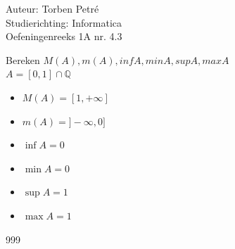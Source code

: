 \documentclass[a4paper]{article}
\newcommand{\Q}{\mathbb{Q}}
\begin{document}
  
\noindent \large Auteur: Torben Petré \\
\noindent \large Studierichting: Informatica\\
\noindent \large Oefeningenreeks 1A nr. 4.3\\

\medskip

\normalsize

Bereken $M(A), m(A), inf A, min A, sup A, max A$\\

$A = [0, 1] \cap \Q$\\

\begin{itemize}
	\item $M(A) = [1, +\infty]$\\
	\item $m(A) = ]-\infty, 0]$\\
	\item $\inf A = 0$\\
	\item $\min A = 0$\\
	\item $\sup A = 1$\\
	\item $\max A = 1$\\
\end{itemize}

\begin{thebibliography}{999}
\end{thebibliography}
\end{document}
